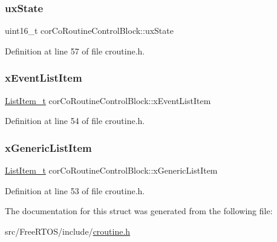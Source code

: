 \subsubsection{\texorpdfstring{ux\+State}{uxState}}
{\footnotesize\ttfamily uint16\+\_\+t cor\+Co\+Routine\+Control\+Block\+::ux\+State}



Definition at line 57 of file croutine.\+h.

\mbox{\label{structcor_co_routine_control_block_a105d316da0069f766acc3b210afed1b9}} 
\subsubsection{\texorpdfstring{x\+Event\+List\+Item}{xEventListItem}}
{\footnotesize\ttfamily \hyperlink{list_8h_a1a62d469392f9bfe2443e7efab9c8398}{List\+Item\+\_\+t} cor\+Co\+Routine\+Control\+Block\+::x\+Event\+List\+Item}



Definition at line 54 of file croutine.\+h.

\mbox{\label{structcor_co_routine_control_block_aa2900494db8782eeb8ef12d482501406}} 
\subsubsection{\texorpdfstring{x\+Generic\+List\+Item}{xGenericListItem}}
{\footnotesize\ttfamily \hyperlink{list_8h_a1a62d469392f9bfe2443e7efab9c8398}{List\+Item\+\_\+t} cor\+Co\+Routine\+Control\+Block\+::x\+Generic\+List\+Item}



Definition at line 53 of file croutine.\+h.



The documentation for this struct was generated from the following file\+:\begin{DoxyCompactItemize}
\item 
src/\+Free\+R\+T\+O\+S/include/\hyperlink{croutine_8h}{croutine.\+h}\end{DoxyCompactItemize}
